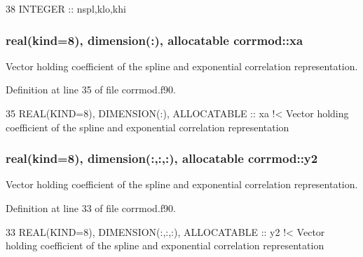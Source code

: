 \begin{DoxyCode}
38   \textcolor{keywordtype}{INTEGER} :: nspl,klo,khi
\end{DoxyCode}
\subsubsection[{\texorpdfstring{xa}{xa}}]{\setlength{\rightskip}{0pt plus 5cm}real(kind=8), dimension(\+:), allocatable corrmod\+::xa\hspace{0.3cm}{\ttfamily [private]}}\hypertarget{namespacecorrmod_a4af3bd2a2042f69a0fc89df8eba38de7}{}\label{namespacecorrmod_a4af3bd2a2042f69a0fc89df8eba38de7}


Vector holding coefficient of the spline and exponential correlation representation. 



Definition at line 35 of file corrmod.\+f90.


\begin{DoxyCode}
35   \textcolor{keywordtype}{REAL(KIND=8)}, \textcolor{keywordtype}{DIMENSION(:)}, \textcolor{keywordtype}{ALLOCATABLE} :: xa\textcolor{comment}{ !< Vector holding coefficient of the spline and exponential
       correlation representation}
\end{DoxyCode}
\subsubsection[{\texorpdfstring{y2}{y2}}]{\setlength{\rightskip}{0pt plus 5cm}real(kind=8), dimension(\+:,\+:,\+:), allocatable corrmod\+::y2\hspace{0.3cm}{\ttfamily [private]}}\hypertarget{namespacecorrmod_abd47fec6688f9997847712f6f44c7f08}{}\label{namespacecorrmod_abd47fec6688f9997847712f6f44c7f08}


Vector holding coefficient of the spline and exponential correlation representation. 



Definition at line 33 of file corrmod.\+f90.


\begin{DoxyCode}
33   \textcolor{keywordtype}{REAL(KIND=8)}, \textcolor{keywordtype}{DIMENSION(:,:,:)}, \textcolor{keywordtype}{ALLOCATABLE} :: y2\textcolor{comment}{ !< Vector holding coefficient of the spline and
       exponential correlation representation}
\end{DoxyCode}
